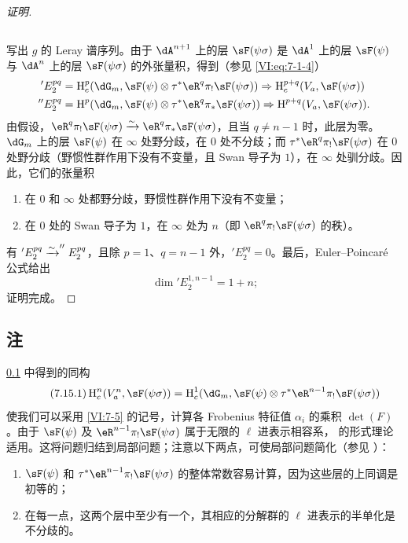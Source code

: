 \begin{proof}[证明]
\subsection{}\label{VI:7-14}

写出 $g$ 的 Leray 谱序列。由于 $\dA^{n+1}$ 上的层 $\sF(\psi\sigma)$ 是 $\dA^1$ 上的层 $\sF(\psi)$ 与 $\dA^n$ 上的层 $\sF(\psi\sigma)$ 的外张量积，得到（参见 \eqref{VI:eq:7-1-4}）
\begin{align*}
  'E_2^{p q} &= \h_c^p(\dG_m,\sF(\psi)\otimes \tau^\ast \eR^q \pi_! \sF(\psi\sigma)) \Rightarrow \h_c^{p+q}(V_a,\sF(\psi\sigma)) \\
  ''E_2^{p q} &= \h^p(\dG_m,\sF(\psi)\otimes \tau^\ast \eR^q \pi_\ast \sF(\psi\sigma)) \Rightarrow \h^{p+q}(V_a,\sF(\psi\sigma)) \text{.}
\end{align*}
由假设，$\eR^q \pi_! \sF(\psi\sigma) \iso \eR^q \pi_\ast \sF(\psi\sigma)$，且当 $q\ne n-1$ 时，此层为零。$\dG_m$ 上的层 $\sF(\psi)$ 在 $\infty$ 处野分歧，在 $0$ 处不分歧；而 $\tau^\ast \eR^q \pi_! \sF(\psi\sigma)$ 在 $0$ 处野分歧（野惯性群作用下没有不变量，且 Swan 导子为 $1$），在 $\infty$ 处驯分歧。因此，它们的张量积
\begin{enumerate}[\indent a)]
  \item 在 $0$ 和 $\infty$ 处都野分歧，野惯性群作用下没有不变量；
  \item 在 $0$ 处的 Swan 导子为 $1$，在 $\infty$ 处为 $n$（即 $\eR^q \pi_! \sF(\psi\sigma)$ 的秩）。
\end{enumerate}
有 $'E_2^{p q} \xrightarrow\sim ''E_2^{p q}$，且除 $p=1$、$q=n-1$ 外，$'E_2^{p q}=0$。最后，Euler--Poincaré 公式给出
\[
  \dim{'E_2^{1,n-1}} = 1+n \text{;}
\]
证明完成。
\end{proof}

\subsection{注}\label{VI:7-15}

\ref{VI:7-14} 中得到的同构
\begin{equation*}\tag{7.15.1}\label{VI:eq:7-15-1}
  \h_c^n(V_a^n,\sF(\psi\sigma)) = \h_c^1(\dG_m,\sF(\psi)\otimes \tau^\ast \eR^{n-1} \pi_! \sF(\psi\sigma))
\end{equation*}
使我们可以采用 \ref{VI:7-5} 的记号，计算各 Frobenius 特征值 $\alpha_i$ 的乘积 $\det(F)$。由于 $\sF(\psi)$ 及 $\eR^{n-1} \pi_! \sF(\psi\sigma)$ 属于无限的 $\ell$ 进表示相容系，\cite{de73} 的形式理论适用。这将问题归结到局部问题；注意以下两点，可使局部问题简化（参见 \cite[9.5]{de73}）：
\begin{enumerate}[\indent a)]
  \item $\sF(\psi)$ 和 $\tau^\ast \eR^{n-1} \pi_! \sF(\psi\sigma)$ 的整体常数容易计算，因为这些层的上同调是初等的；
  \item 在每一点，这两个层中至少有一个，其相应的分解群的 $\ell$ 进表示的半单化是不分歧的。
\end{enumerate}

